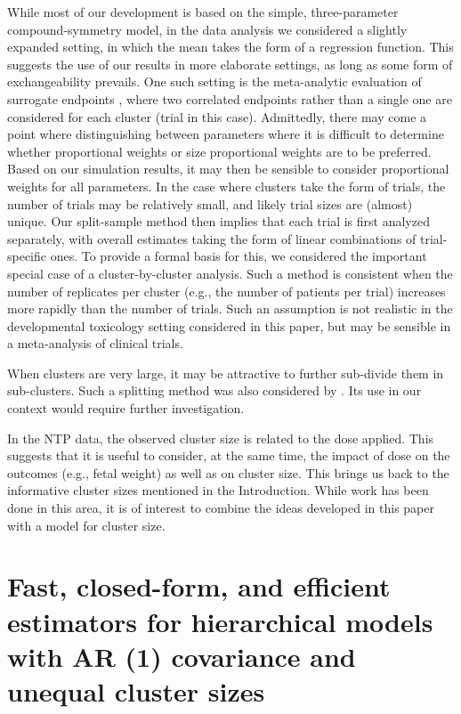 \documentclass[11pt,a5paper,twoside]{book}
\begin{document}
While most of our development is based on the simple, three-parameter 
compound-symmetry model, in the data analysis we considered a slightly 
expanded setting, in which the mean takes the form of a regression 
function. This suggests the 
use of our results in more elaborate settings, as long as some 
form of exchangeability prevails. One such setting is the meta-analytic 
evaluation of surrogate endpoints \citep{burzykowski2006evaluation}, where two correlated 
endpoints rather than a single one are considered for each cluster 
(trial in this case). Admittedly, there may come a point where 
distinguishing between parameters where it is difficult to determine whether proportional weights or 
size proportional weights are to be preferred. Based on our simulation results, it may 
then be sensible to consider proportional weights for all parameters. 
In the case where clusters take the form of trials, the number of 
trials may be relatively small, and likely trial sizes are (almost) 
unique. Our split-sample method  then implies that each trial is 
first analyzed separately, with overall estimates taking the form of 
linear combinations of trial-specific ones. To provide a formal basis 
for this, we considered the important special case of a 
cluster-by-cluster analysis. Such a method is 
consistent when the number of replicates per cluster (e.g., 
the number of patients per trial) increases more rapidly than 
the number of trials.  Such an assumption is not realistic in
the developmental toxicology setting considered in this paper, 
but may be  sensible in a meta-analysis of clinical trials.

When clusters are very large, it may be attractive to further 
sub-divide them in sub-clusters. Such a splitting method was also 
considered by \cite{Iddi2011}. Its use in our context would require 
further investigation.

In the NTP data, the observed cluster size is related to the dose 
applied. This suggests that it is useful to consider, at the same 
time, the impact of dose on the outcomes (e.g., fetal weight) as 
well as on cluster size. This brings us back to the informative 
cluster sizes mentioned in the Introduction. While work has been 
done in this area, it is of interest to combine the ideas developed 
in this paper with a model for cluster size.





\newpage


\section[AR1 structure]{Fast, closed-form, and efficient estimators for hierarchical models with AR (1) covariance and unequal cluster sizes}
\end{document}
